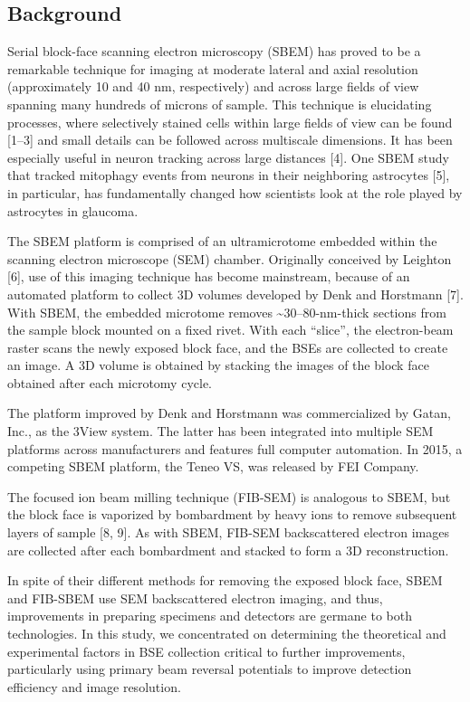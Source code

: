 \documentclass{article}
\begin{document}
\subsection*{Background}
Serial block-face scanning electron microscopy (SBEM) has proved to be a remarkable technique for imaging at moderate lateral and axial resolution (approximately 10 and 40 nm, respectively) and across large fields of view spanning many hundreds of microns of sample. This technique is elucidating processes, where selectively stained cells within large fields of view can be found [1–3] and small details can be followed across multiscale dimensions. It has been especially useful in neuron tracking across large distances [4]. One SBEM study that tracked mitophagy events from neurons in their neighboring astrocytes [5], in particular, has fundamentally changed how scientists look at the role played by astrocytes in glaucoma.

The SBEM platform is comprised of an ultramicrotome embedded within the scanning electron microscope (SEM) chamber. Originally conceived by Leighton [6], use of this imaging technique has become mainstream, because of an automated platform to collect 3D volumes developed by Denk and Horstmann [7]. With SBEM, the embedded microtome removes \textasciitilde{}30–80-nm-thick sections from the sample block mounted on a fixed rivet. With each “slice”, the electron-beam raster scans the newly exposed block face, and the BSEs are collected to create an image. A 3D volume is obtained by stacking the images of the block face obtained after each microtomy cycle.

The platform improved by Denk and Horstmann was commercialized by Gatan, Inc., as the 3View system. The latter has been integrated into multiple SEM platforms across manufacturers and features full computer automation. In 2015, a competing SBEM platform, the Teneo VS, was released by FEI Company.

The focused ion beam milling technique (FIB-SEM) is analogous to SBEM, but the block face is vaporized by bombardment by heavy ions to remove subsequent layers of sample [8, 9]. As with SBEM, FIB-SEM backscattered electron images are collected after each bombardment and stacked to form a 3D reconstruction.

In spite of their different methods for removing the exposed block face, SBEM and FIB-SBEM use SEM backscattered electron imaging, and thus, improvements in preparing specimens and detectors are germane to both technologies. In this study, we concentrated on determining the theoretical and experimental factors in BSE collection critical to further improvements, particularly using primary beam reversal potentials to improve detection efficiency and image resolution.
\end{document}
